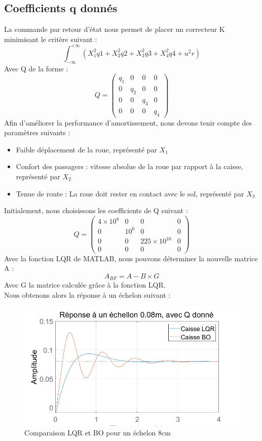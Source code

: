\documentclass[a4paper,12pt]{insa} %
\begin{document}
 \subsection{Coefficients q donnés}
 La commande par retour d'état nous permet de placer un correcteur K minimisant le critère suivant :\\
 $$
 \int_{-\infty }^{+\infty}(X^2_1 q1 + X^2_2 q2 + X^2_3q3+X^2_4 q4 + u^2 r)
 $$
 Avec Q de la forme : 
 $$
 Q = 
 \begin{pmatrix}
 q_1 & 0 & 0 & 0 \\ 
 0 & q_2 & 0 & 0 \\ 
 0 & 0 & q_3 & 0 \\ 
 0 & 0 & 0 & q_4
 \end{pmatrix} 
$$
Afin d'améliorer la performance d'amortissement, nous devons tenir compte des paramètres suivants : 
\begin{itemize}
\item Faible déplacement de la roue, représenté par $X_1$
\item Confort des passagers : vitesse absolue de la roue par rapport à la caisse, représenté par $X_2$
\item Tenue de route : La roue doit rester en contact avec le sol, représenté par $X_3$ 
\end{itemize}
Initialement, nous choisissons les coefficients de Q suivant : 
 $$
 Q = 
 \begin{pmatrix}
 4\times10^8 & 0 & 0 & 0 \\ 
 0 & 10^6 & 0 & 0 \\ 
 0 & 0 & 225\times10^{10} & 0 \\ 
 0 & 0 & 0 & 0
 \end{pmatrix} 
$$
Avec la fonction LQR de MATLAB, nous pouvons déterminer la nouvelle matrice A : \\
$$A_{BF} = A - B \times G$$
Avec G la matrice calculée grâce à la fonction LQR.\\
Nous obtenons alors la réponse à un échelon suivant : \\
\begin{center}
    \begin{figure}[H]
        \centering
        \includegraphics[width=13cm, keepaspectratio]{figures/step_baseLQR.png}
        \caption{Comparaison LQR et BO pour un échelon 8cm}
    \end{figure}
\end{center}
\end{document}
